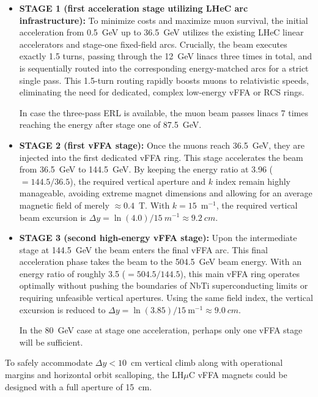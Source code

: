 \documentclass[a4paper,11pt]{article}
\newcommand{\lhuc}{LH\ensuremath{\mu}C\xspace}
\begin{document}
\begin{itemize}

    \item \textbf{STAGE 1 (first acceleration stage utilizing LHeC arc infrastructure):} To minimize costs and maximize muon survival, the initial acceleration from 0.5~GeV up to 36.5~GeV utilizes the existing LHeC linear accelerators and stage-one fixed-field arcs. Crucially, the beam executes exactly 1.5 turns, passing through the 12~GeV linacs three times in total, and is sequentially routed into the corresponding energy-matched arcs for a strict single pass. This 1.5-turn routing rapidly boosts muons to relativistic speeds, eliminating the need for dedicated, complex low-energy vFFA or RCS rings.

    In case the three-pass ERL is available, the muon beam passes linacs 7 times reaching the energy after stage one of 87.5~GeV.
    
    \item \textbf{STAGE 2 (first vFFA stage):} Once the muons reach 36.5~GeV, they are injected into the first dedicated vFFA ring. This stage accelerates the beam from 36.5~GeV to 144.5~GeV. By keeping the energy ratio at 3.96 ($=144.5/36.5$), the required vertical aperture and $k$ index remain highly manageable, avoiding extreme magnet dimensions and allowing for an average magnetic field of merely $\approx 0.4$~T. With $k=15$~m$^{-1}$, the required vertical beam excursion is $\Delta y = \ln(4.0) / 15~m^{-1} \approx 9.2~cm$.
 
    \item \textbf{STAGE 3 (second high-energy vFFA stage):} Upon the intermediate stage at 144.5~GeV the beam enters the final vFFA arc. This final acceleration phase takes the beam to the 504.5~GeV beam energy. With an energy ratio of roughly 3.5 ($=504.5/144.5$), this main vFFA ring operates optimally without pushing the boundaries of NbTi superconducting limits or requiring unfeasible vertical apertures. Using the same field index, the vertical excursion is reduced to $\Delta y = \ln(3.85) / 15~\text{m}^{-1} \approx 9.0~cm$.

    In the 80~GeV case at stage one acceleration, perhaps only one vFFA stage will be sufficient.
\end{itemize}

To safely accommodate $\Delta y <10$~cm vertical climb along with operational margins and horizontal orbit scalloping, the \lhuc vFFA magnets could be designed with a full aperture of 15~cm.
\end{document}
